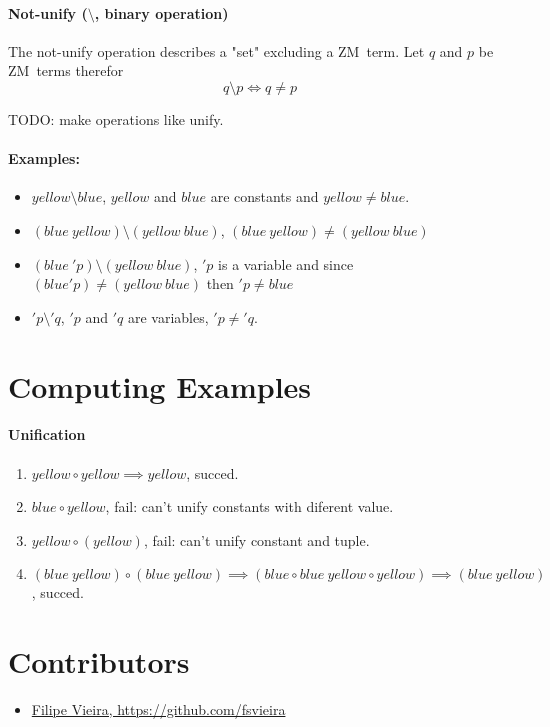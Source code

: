 \documentclass[11pt,a4paper]{report}
\newcommand{\zm}{ZM}
\begin{document}
\paragraph{Not-unify ($\setminus$, binary operation)}

The not-unify operation describes a "set" excluding a \zm\ term.
Let $q$ and $p$ be \zm\ terms therefor 
\[
    q\setminus p \iff q \neq p
\]

TODO: make operations like unify.

\paragraph{Examples:}
\begin{itemize}
\item $yellow\setminus blue$, 
    \subitem $yellow$ and $blue$ are constants and $yellow \neq blue$.
\item $(blue\ yellow)\setminus (yellow\ blue)$, 
    \subitem $(blue\ yellow) \neq (yellow\ blue)$
\item $(blue\ 'p)\setminus (yellow\ blue)$, 
    \subitem $'p$ is a variable and since $(blue 'p) \neq (yellow\ blue)$ then $'p \neq blue$
\item $'p\setminus 'q$,
    \subitem $'p$ and $'q$ are variables, $'p \neq 'q$.
\end{itemize}

\section{Computing Examples}

\paragraph{Unification}
\begin{enumerate}
\item $yellow \circ yellow \implies yellow$, succed.
\item $blue \circ yellow$, fail: can't unify constants with diferent value.
\item $yellow \circ (yellow)$, fail: can't unify constant and tuple.
\item $(blue\ yellow) \circ (blue\ yellow) \implies (blue \circ blue\ yellow \circ yellow) \implies (blue\ yellow)$, succed.
\end{enumerate}

\section{Contributors}
\label{sec:contributors}

\begin{itemize}
    \item \href{https://github.com/fsvieira}{Filipe Vieira, https://github.com/fsvieira}
\end{itemize}
\end{document}
